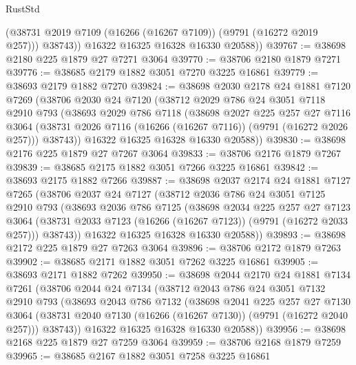 \begin{lexlean}{RustStd}
\begin{coremodule}
            (@38731 @2019 @7109 (@16266 (@16267 @7109)) (@9791 (@16272 @2019 @257)))
            @38743))
        @16322
        @16325
        @16328
        @16330
        @20588))
@39767 := @38698 @2180 @225 @1879 @27 @7271 @3064
@39770 := @38706 @2180 @1879 @7271
@39776 := @38685 @2179 @1882 @3051 @7270 @3225 @16861
@39779 := @38693 @2179 @1882 @7270
@39824 := @38698
    @2030
    @2178
    @24
    @1881
    @7120
    @7269
    (@38706
      @2030
      @24
      @7120
      (@38712
        @2029
        @786
        @24
        @3051
        @7118
        @2910
        @793
        (@38693
          @2029
          @786
          @7118
          (@38698
            @2027
            @225
            @257
            @27
            @7116
            @3064
            (@38731 @2026 @7116 (@16266 (@16267 @7116)) (@9791 (@16272 @2026 @257)))
            @38743))
        @16322
        @16325
        @16328
        @16330
        @20588))
@39830 := @38698 @2176 @225 @1879 @27 @7267 @3064
@39833 := @38706 @2176 @1879 @7267
@39839 := @38685 @2175 @1882 @3051 @7266 @3225 @16861
@39842 := @38693 @2175 @1882 @7266
@39887 := @38698
    @2037
    @2174
    @24
    @1881
    @7127
    @7265
    (@38706
      @2037
      @24
      @7127
      (@38712
        @2036
        @786
        @24
        @3051
        @7125
        @2910
        @793
        (@38693
          @2036
          @786
          @7125
          (@38698
            @2034
            @225
            @257
            @27
            @7123
            @3064
            (@38731 @2033 @7123 (@16266 (@16267 @7123)) (@9791 (@16272 @2033 @257)))
            @38743))
        @16322
        @16325
        @16328
        @16330
        @20588))
@39893 := @38698 @2172 @225 @1879 @27 @7263 @3064
@39896 := @38706 @2172 @1879 @7263
@39902 := @38685 @2171 @1882 @3051 @7262 @3225 @16861
@39905 := @38693 @2171 @1882 @7262
@39950 := @38698
    @2044
    @2170
    @24
    @1881
    @7134
    @7261
    (@38706
      @2044
      @24
      @7134
      (@38712
        @2043
        @786
        @24
        @3051
        @7132
        @2910
        @793
        (@38693
          @2043
          @786
          @7132
          (@38698
            @2041
            @225
            @257
            @27
            @7130
            @3064
            (@38731 @2040 @7130 (@16266 (@16267 @7130)) (@9791 (@16272 @2040 @257)))
            @38743))
        @16322
        @16325
        @16328
        @16330
        @20588))
@39956 := @38698 @2168 @225 @1879 @27 @7259 @3064
@39959 := @38706 @2168 @1879 @7259
@39965 := @38685 @2167 @1882 @3051 @7258 @3225 @16861

\end{coremodule}
\end{lexlean}
